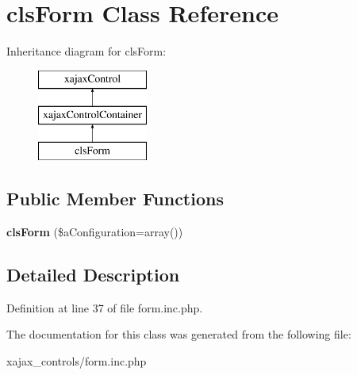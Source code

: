 \hypertarget{classclsForm}{
\section{clsForm Class Reference}
\label{classclsForm}
}
Inheritance diagram for clsForm:\begin{figure}[H]
\begin{center}
\leavevmode
\includegraphics[height=3.000000cm]{classclsForm}
\end{center}
\end{figure}
\subsection*{Public Member Functions}
\begin{DoxyCompactItemize}
\item 
\hypertarget{classclsForm_a6f0fdbc3f48b17243405de32671da96d}{
{\bfseries clsForm} (\$aConfiguration=array())}
\label{classclsForm_a6f0fdbc3f48b17243405de32671da96d}

\end{DoxyCompactItemize}


\subsection{Detailed Description}


Definition at line 37 of file form.inc.php.



The documentation for this class was generated from the following file:\begin{DoxyCompactItemize}
\item 
xajax\_\-controls/form.inc.php\end{DoxyCompactItemize}
